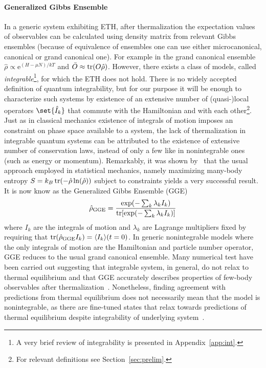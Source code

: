 \paragraph{Generalized Gibbs Ensemble}In a generic system exhibiting ETH, after thermalization the expectation values
of observables can be calculated using density matrix from relevant Gibbs ensembles
(because of equivalence of ensembles one can use either microcanonical, canonical or
grand canonical one).
For example in the grand canonical ensemble \(\hat{\rho} \propto \mathrm{e}^{(H-\mu N)/kT}\)
and \(\bar{O}\approx \tr(O \hat{\rho})\).
However, there exists a class of models, called \textit{integrable}\footnote{A very brief review of integrability is presented in Appendix~\ref{app:int}.},
for which the ETH does not hold. There is no widely accepted definition of quantum
integrability, but for our purpose it will be enough to characterize such systems by
existence of an extensive number of (quasi-)local operators \(\set{\hat{I}_k}\) that commute with
the Hamiltonian and with each  other\footnote{For relevant definitions see Section~\ref{sec:prelim}.}.
Just as in classical mechanics existence of integrals of motion imposes an constraint on phase
space available to a system, the lack of thermalization in integrable quantum systems can be
attributed to the existence of extensive number of conservation laws, instead of only a few like
in nonintegrable ones (such as energy or momentum). Remarkably, it was shown by~\textcite{Rigol2007}
that the usual approach employed in statistical mechanics, namely maximizing many-body entropy
\(S = k_B \tr(-\hat{\rho}\ln(\hat{\rho}))\) subject to constraints yields a very successful result.
It is now know as the Generalized Gibbs Ensemble (GGE)
\begin{equation}
    \hat{\rho}_{\mathrm{GGE}} = \frac{\exp({-\sum_k \lambda_k I_k})}{
        \tr[\exp({-\sum_k \lambda_k I_k})]}  
\end{equation}
where \(I_k\) are the integrals of motion and \(\lambda_k\) are Lagrange multipliers fixed
by requiring that \(\tr(\hat{\rho}_{\mathrm{GGE}}I_k) = \langle I_k\rangle(t=0)\).
In generic nonintegrable models where the only integrals of motion are the Hamiltonian and
particle number operator, GGE reduces to the usual grand canonical ensemble. 
Many numerical test have been carried out suggesting that integrable system, in general, do not
relax to thermal equilibrium and that GGE accurately describes properties of few-body
 observables after thermalization~\autocite{Cassidy2011,Rigol2007,Vidmar2016,Cazalilla2006}.
Nonetheless, finding agreement with predictions from thermal equilibrium does not necessarily
mean that the model is nonintegrable, as there are fine-tuned states that relax towards
predictions of thermal equilibrium despite integrability of underlying 
system~\autocite{Rigol2012,Rigol2011a,He2012}. 

